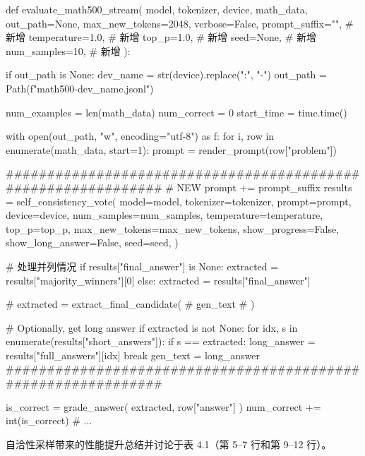 \begin{codebox}
def evaluate_math500_stream(
    model,
    tokenizer,
    device,
    math_data,
    out_path=None,
    max_new_tokens=2048,
    verbose=False,
    prompt_suffix="",    # 新增
    temperature=1.0,     # 新增
    top_p=1.0,           # 新增
    seed=None,           # 新增
    num_samples=10,      # 新增
):

    if out_path is None:
        dev_name = str(device).replace(":", "-")
        out_path = Path(f"math500-{dev_name}.jsonl")

    num_examples = len(math_data)
    num_correct = 0
    start_time = time.time()

    with open(out_path, "w", encoding="utf-8") as f:
        for i, row in enumerate(math_data, start=1):
            prompt = render_prompt(row["problem"])

            ##############################################################
            # NEW
            prompt += prompt_suffix
            results = self_consistency_vote(
                model=model,
                tokenizer=tokenizer,
                prompt=prompt,
                device=device,
                num_samples=num_samples,
                temperature=temperature,
                top_p=top_p,
                max_new_tokens=max_new_tokens,
                show_progress=False,
                show_long_answer=False,
                seed=seed,
            )

            # 处理并列情况
            if results["final_answer"] is None:
                extracted = results["majority_winners"][0]
            else:
                extracted = results["final_answer"]

            # extracted = extract_final_candidate(
            #     gen_text
            # )

            # Optionally, get long answer
            if extracted is not None:
                for idx, s in enumerate(results["short_answers"]):
                    if s == extracted:
                        long_answer = results["full_answers"][idx]
                        break
            gen_text = long_answer
            ##############################################################

            is_correct = grade_answer(
                extracted, row["answer"]
            )
            num_correct += int(is_correct)
    # ...
\end{codebox}

自洽性采样带来的性能提升总结并讨论于表 4.1（第 5–7 行和第 9–12 行）。

